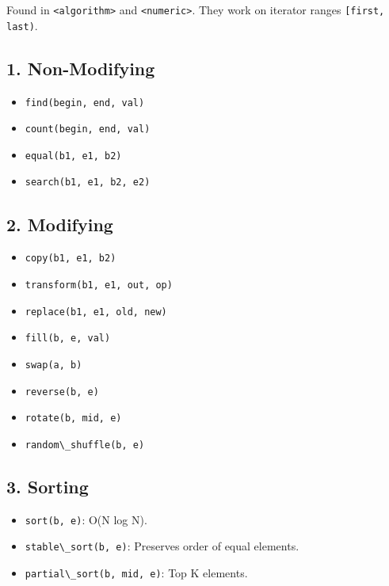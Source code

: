 Found in \passthrough{\lstinline!<algorithm>!} and
\passthrough{\lstinline!<numeric>!}. They work on iterator ranges
\passthrough{\lstinline![first, last)!}.

\hypertarget{non-modifying}{%
\subsection{1. Non-Modifying}\label{non-modifying}}

\begin{itemize}
\tightlist
\item
  \passthrough{\lstinline!find(begin, end, val)!}
\item
  \passthrough{\lstinline!count(begin, end, val)!}
\item
  \passthrough{\lstinline!equal(b1, e1, b2)!}
\item
  \passthrough{\lstinline!search(b1, e1, b2, e2)!}
\end{itemize}

\hypertarget{modifying}{%
\subsection{2. Modifying}\label{modifying}}

\begin{itemize}
\tightlist
\item
  \passthrough{\lstinline!copy(b1, e1, b2)!}
\item
  \passthrough{\lstinline!transform(b1, e1, out, op)!}
\item
  \passthrough{\lstinline!replace(b1, e1, old, new)!}
\item
  \passthrough{\lstinline!fill(b, e, val)!}
\item
  \passthrough{\lstinline!swap(a, b)!}
\item
  \passthrough{\lstinline!reverse(b, e)!}
\item
  \passthrough{\lstinline!rotate(b, mid, e)!}
\item
  \passthrough{\lstinline!random\_shuffle(b, e)!}
\end{itemize}

\hypertarget{sorting}{%
\subsection{3. Sorting}\label{sorting}}

\begin{itemize}
\tightlist
\item
  \passthrough{\lstinline!sort(b, e)!}: O(N log N).
\item
  \passthrough{\lstinline!stable\_sort(b, e)!}: Preserves order of equal
  elements.
\item
  \passthrough{\lstinline!partial\_sort(b, mid, e)!}: Top K elements.
\end{itemize}

